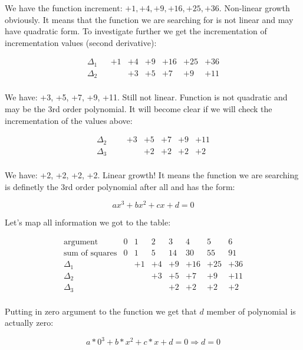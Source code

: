 \documentclass[14pt]{article}
\begin{document}
      We have the function increment: $+1, +4, +9, +16, +25, +36$. Non-linear growth obviously. It means that the function we are searching for is not linear and may have quadratic form. To investigate further we get the incrementation of incrementation values (second derivative):

      $$
      \begin{array}{l|rrrrrrr}
        \varDelta_1 &  & +1 & +4 & +9 & +16 & +25 & +36 \\
        \hline
        \varDelta_2 &  &  & +3 & +5 & +7 & +9 & +11 \\
      \end{array}
      $$

      We have: +3, +5, +7, +9, +11. Still not linear. Function is not quadratic and may be the 3rd order polynomial. It will become clear if we will check the incrementation of the values above:

      $$
      \begin{array}{l|rrrrrrr}
        \varDelta_2 &  &  & +3 & +5 & +7 & +9 & +11 \\
        \hline
        \varDelta_3 &  &  &  & +2 & +2 & +2 & +2 \\
      \end{array}
      $$

      We have: +2, +2, +2, +2. Linear growth! It means the function we are searching is definetly the 3rd order polynomial after all and has the form:

      $$ax^3 + bx^2 + cx + d = 0$$

      Let's map all information we got to the table:

      $$
      \begin{array}{l|rrrrrrr}
        \text{argument} & 0 & 1 & 2 & 3 & 4 & 5 & 6 \\
        \hline
        \text{sum of squares} & 0 & 1 & 5 & 14 & 30 & 55 & 91 \\
        \varDelta_1 &  & +1 & +4 & +9 & +16 & +25 & +36 \\
        \varDelta_2 &  &  & +3 & +5 & +7 & +9 & +11 \\
        \varDelta_3 &  &  &  & +2 & +2 & +2 & +2 \\
      \end{array}
      $$

      Putting in zero argument to the function we get that $\mathit{d}$ member of polynomial is actually zero:

      $$a * 0^3 + b * x^2 + c * x + d = 0 \Rightarrow d = 0$$
\end{document}
